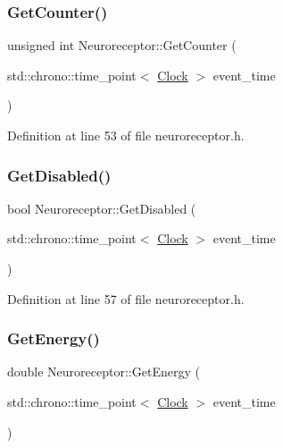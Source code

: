 \subsubsection{\texorpdfstring{Get\+Counter()}{GetCounter()}}
{\footnotesize\ttfamily unsigned int Neuroreceptor\+::\+Get\+Counter (\begin{DoxyParamCaption}\item[{std\+::chrono\+::time\+\_\+point$<$ \hyperlink{universe_8h_a0ef8d951d1ca5ab3cfaf7ab4c7a6fd80}{Clock} $>$}]{event\+\_\+time }\end{DoxyParamCaption})\hspace{0.3cm}{\ttfamily [inline]}}



Definition at line 53 of file neuroreceptor.\+h.

\mbox{\label{class_neuroreceptor_aff4754990dc5b8d0105db281c02031d7}} 
\subsubsection{\texorpdfstring{Get\+Disabled()}{GetDisabled()}}
{\footnotesize\ttfamily bool Neuroreceptor\+::\+Get\+Disabled (\begin{DoxyParamCaption}\item[{std\+::chrono\+::time\+\_\+point$<$ \hyperlink{universe_8h_a0ef8d951d1ca5ab3cfaf7ab4c7a6fd80}{Clock} $>$}]{event\+\_\+time }\end{DoxyParamCaption})\hspace{0.3cm}{\ttfamily [inline]}}



Definition at line 57 of file neuroreceptor.\+h.

\mbox{\label{class_neuroreceptor_abc151381ec5e7c39bb45f87a9fd17b9a}} 
\subsubsection{\texorpdfstring{Get\+Energy()}{GetEnergy()}}
{\footnotesize\ttfamily double Neuroreceptor\+::\+Get\+Energy (\begin{DoxyParamCaption}\item[{std\+::chrono\+::time\+\_\+point$<$ \hyperlink{universe_8h_a0ef8d951d1ca5ab3cfaf7ab4c7a6fd80}{Clock} $>$}]{event\+\_\+time }\end{DoxyParamCaption})\hspace{0.3cm}{\ttfamily [inline]}}



